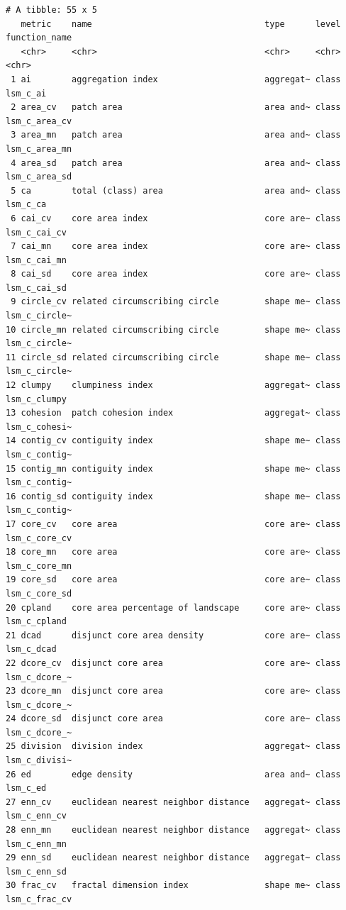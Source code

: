 \documentclass[
  letterpaper,
  DIV=11,
  numbers=noendperiod]{scrartcl}
\begin{document}
\begin{verbatim}
# A tibble: 55 x 5
   metric    name                                  type      level function_name
   <chr>     <chr>                                 <chr>     <chr> <chr>        
 1 ai        aggregation index                     aggregat~ class lsm_c_ai     
 2 area_cv   patch area                            area and~ class lsm_c_area_cv
 3 area_mn   patch area                            area and~ class lsm_c_area_mn
 4 area_sd   patch area                            area and~ class lsm_c_area_sd
 5 ca        total (class) area                    area and~ class lsm_c_ca     
 6 cai_cv    core area index                       core are~ class lsm_c_cai_cv 
 7 cai_mn    core area index                       core are~ class lsm_c_cai_mn 
 8 cai_sd    core area index                       core are~ class lsm_c_cai_sd 
 9 circle_cv related circumscribing circle         shape me~ class lsm_c_circle~
10 circle_mn related circumscribing circle         shape me~ class lsm_c_circle~
11 circle_sd related circumscribing circle         shape me~ class lsm_c_circle~
12 clumpy    clumpiness index                      aggregat~ class lsm_c_clumpy 
13 cohesion  patch cohesion index                  aggregat~ class lsm_c_cohesi~
14 contig_cv contiguity index                      shape me~ class lsm_c_contig~
15 contig_mn contiguity index                      shape me~ class lsm_c_contig~
16 contig_sd contiguity index                      shape me~ class lsm_c_contig~
17 core_cv   core area                             core are~ class lsm_c_core_cv
18 core_mn   core area                             core are~ class lsm_c_core_mn
19 core_sd   core area                             core are~ class lsm_c_core_sd
20 cpland    core area percentage of landscape     core are~ class lsm_c_cpland 
21 dcad      disjunct core area density            core are~ class lsm_c_dcad   
22 dcore_cv  disjunct core area                    core are~ class lsm_c_dcore_~
23 dcore_mn  disjunct core area                    core are~ class lsm_c_dcore_~
24 dcore_sd  disjunct core area                    core are~ class lsm_c_dcore_~
25 division  division index                        aggregat~ class lsm_c_divisi~
26 ed        edge density                          area and~ class lsm_c_ed     
27 enn_cv    euclidean nearest neighbor distance   aggregat~ class lsm_c_enn_cv 
28 enn_mn    euclidean nearest neighbor distance   aggregat~ class lsm_c_enn_mn 
29 enn_sd    euclidean nearest neighbor distance   aggregat~ class lsm_c_enn_sd 
30 frac_cv   fractal dimension index               shape me~ class lsm_c_frac_cv

\end{verbatim}
\end{document}
